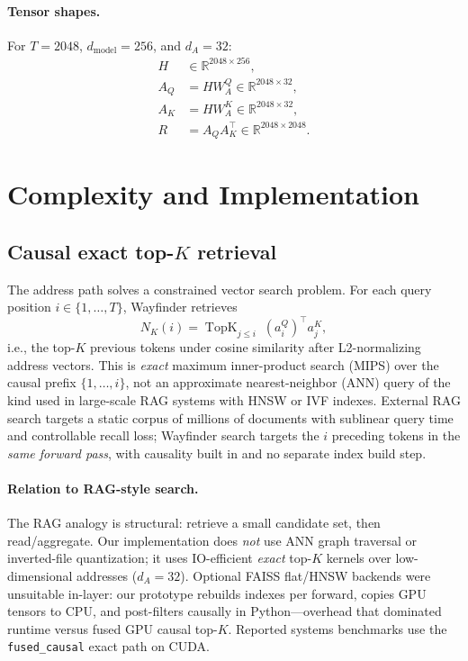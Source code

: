 \documentclass{article}
\newcommand{\topk}{\operatorname{TopK}}
\begin{document}
\paragraph{Tensor shapes.}
For $T=2048$, $d_{\mathrm{model}}=256$, and $d_A=32$:
\begin{align}
H &\in \mathbb{R}^{2048 \times 256}, \\
A_Q &= H W_A^Q \in \mathbb{R}^{2048 \times 32}, \\
A_K &= H W_A^K \in \mathbb{R}^{2048 \times 32}, \\
R &= A_Q A_K^\top \in \mathbb{R}^{2048 \times 2048}.
\end{align}

\section{Complexity and Implementation}

\subsection{Causal exact top-$K$ retrieval}

The address path solves a constrained vector search problem. For each query position $i \in \{1,\ldots,T\}$, Wayfinder retrieves
\begin{equation}
N_K(i)=\topk_{j \le i}\; (a_i^Q)^\top a_j^K ,
\end{equation}
i.e., the top-$K$ previous tokens under cosine similarity after L2-normalizing address vectors. This is \emph{exact} maximum inner-product search (MIPS) over the causal prefix $\{1,\ldots,i\}$, not an approximate nearest-neighbor (ANN) query of the kind used in large-scale RAG systems with HNSW or IVF indexes. External RAG search targets a static corpus of millions of documents with sublinear query time and controllable recall loss; Wayfinder search targets the $i$ preceding tokens in the \emph{same forward pass}, with causality built in and no separate index build step.

\paragraph{Relation to RAG-style search.}
The RAG analogy is structural: retrieve a small candidate set, then read/aggregate. Our implementation does \emph{not} use ANN graph traversal or inverted-file quantization; it uses IO-efficient \emph{exact} top-$K$ kernels over low-dimensional addresses ($d_A=32$). Optional FAISS flat/HNSW backends were unsuitable in-layer: our prototype rebuilds indexes per forward, copies GPU tensors to CPU, and post-filters causally in Python---overhead that dominated runtime versus fused GPU causal top-$K$. Reported systems benchmarks use the \texttt{fused\_causal} exact path on CUDA.
\end{document}

